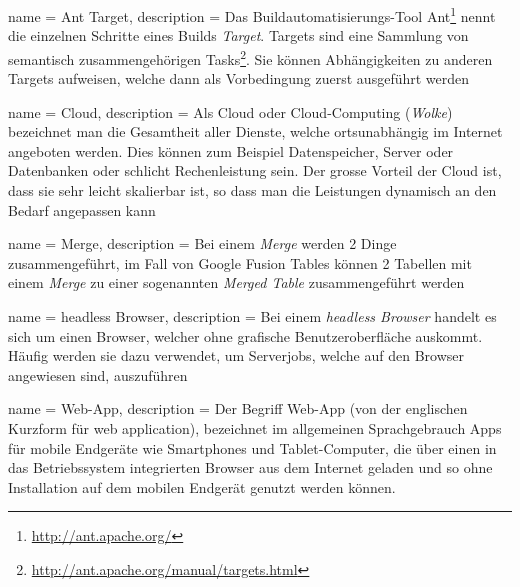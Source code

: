  {
	name = Ant Target,
	description = {Das Buildautomatisierungs-Tool Ant\footnote{\url{http://ant.apache.org/}} nennt die einzelnen Schritte eines Builds \emph{Target}. Targets sind eine Sammlung von semantisch zusammengehörigen Tasks\footnote{\url{http://ant.apache.org/manual/targets.html}}. Sie können Abhängigkeiten zu anderen Targets aufweisen, welche dann als Vorbedingung zuerst ausgeführt werden}
}

 {
	name = Cloud,
	description = {Als Cloud oder Cloud-Computing (\emph{Wolke}) bezeichnet man die Gesamtheit aller Dienste, welche ortsunabhängig im Internet angeboten werden. Dies können zum Beispiel Datenspeicher, Server oder Datenbanken oder schlicht Rechenleistung sein. Der grosse Vorteil der Cloud ist, dass sie sehr leicht skalierbar ist, so dass man  die Leistungen dynamisch an den Bedarf angepassen kann\cite{cloud}}
}

 {
	name = Merge,
	description = {Bei einem \emph{Merge} werden 2 Dinge zusammengeführt, im Fall von Google Fusion Tables können 2 Tabellen mit einem \emph{Merge} zu einer sogenannten \emph{Merged Table} zusammengeführt werden}
}

 {
	name = headless Browser,
	description = {Bei einem \emph{headless Browser} handelt es sich um einen Browser, welcher ohne grafische Benutzeroberfläche auskommt. Häufig werden sie dazu verwendet, um Serverjobs, welche auf den Browser angewiesen sind, auszuführen}
}

 {
	name = Web-App,
	description = {Der Begriff Web-App (von der englischen Kurzform für web application), bezeichnet im allgemeinen Sprachgebrauch Apps für mobile Endgeräte wie Smartphones und Tablet-Computer, die über einen in das Betriebssystem integrierten Browser aus dem Internet geladen und so ohne Installation auf dem mobilen Endgerät genutzt werden können.\cite{webapp}}
}